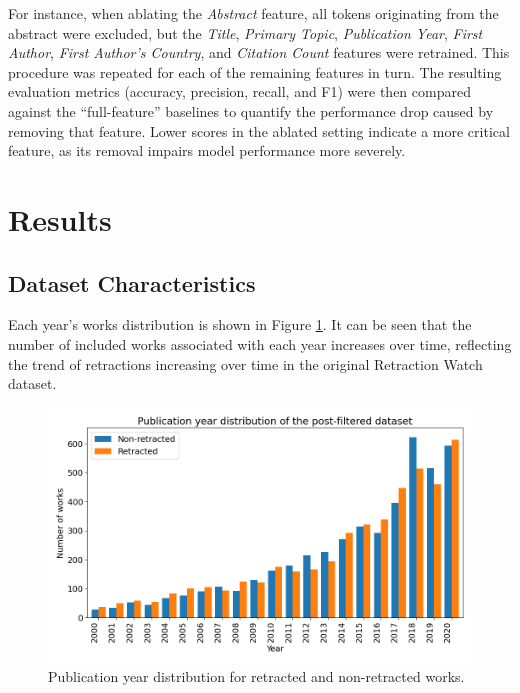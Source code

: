 \documentclass[pdflatex,sn-mathphys-num]{sn-jnl}
\begin{document}
For instance, when ablating the \emph{Abstract} feature, all tokens originating from the abstract were excluded, but the \emph{Title}, \emph{Primary Topic}, \emph{Publication Year}, \emph{First Author}, \emph{First Author’s Country}, and \emph{Citation Count} features were retrained. This procedure was repeated for each of the remaining features in turn. The resulting evaluation metrics (accuracy, precision, recall, and F1) were then compared against the ``full-feature'' baselines to quantify the performance drop caused by removing that feature. Lower scores in the ablated setting indicate a more critical feature, as its removal impairs model performance more severely.


\section{Results}



\subsection{Dataset Characteristics}\label{sec3}



Each year's works distribution is shown in Figure \ref{fig:publication_parity}. It can be seen that the number of included works associated with each year increases over time, reflecting the trend of retractions increasing over time in the original Retraction Watch dataset.

\begin{figure}
	\centering
	\includegraphics[width=1\linewidth]{output.png}
	\caption{Publication year distribution for retracted and non-retracted works.}
	\label{fig:publication_parity}
\end{figure}
\end{document}
